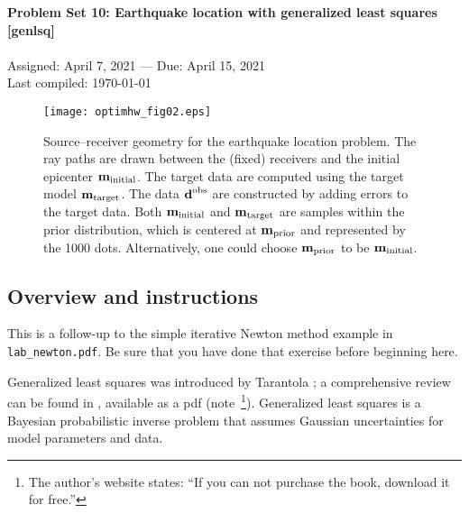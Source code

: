 \documentclass[11pt,titlepage,fleqn]{article}
\begin{document}

\begin{spacing}{1.2}
\centering
{\large \bf Problem Set 10: Earthquake location with generalized least squares [genlsq]} \\
\cltag\ \\
Assigned: April 7, 2021 --- Due: April 15, 2021 \\
Last compiled: \today
\end{spacing}


\vspace{1cm}
\begin{figure}[h]
\centering
\texttt{[image: optimhw\_fig02.eps]}
\caption[Source-receiver geometry]
{{
Source--receiver geometry for the earthquake location problem. The ray paths are drawn between the (fixed) receivers and the initial epicenter $\mbox{${\bf m}$}_{\rm initial}$.
The target data are computed using the target model \textcolor{red}{$\mbox{${\bf m}$}_{\rm target}$}.
The data $\mbox{${\bf d}$}^{\rm obs}$ are constructed by adding errors to the target data.
Both $\mbox{${\bf m}$}_{\rm initial}$ and $\mbox{${\bf m}$}_{\rm target}$ are samples within the prior distribution, which is centered at \textcolor{blue}{$\mbox{${\bf m}$}_{\rm prior}$} and represented by the 1000 dots. Alternatively, one could choose \textcolor{blue}{$\mbox{${\bf m}$}_{\rm prior}$} to be $\mbox{${\bf m}$}_{\rm initial}$.
\label{fig:srcrec}
}}
\end{figure}


\pagebreak
\subsection*{Overview and instructions}

This is a follow-up to the simple iterative Newton method example in \verb+lab_newton.pdf+. Be sure that you have done that exercise before beginning here.

Generalized least squares was introduced by Tarantola \citep{TarantolaValette1982quest,TarantolaValette1982nonlinear}; a comprehensive review can be found in \citet{Tarantola2005}, available as a pdf (note~\footnote{The author's website states: ``If you can not purchase the book, download it for free.''}). Generalized least squares is a Bayesian probabilistic inverse problem that assumes Gaussian uncertainties for model parameters and data.
\end{document}
